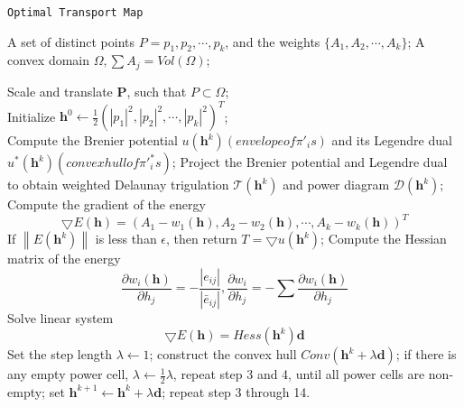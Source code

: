 \begin{algorithm}[H]
    \renewcommand{\algorithmicrequire}{\textbf{Input:}}
	\renewcommand{\algorithmicensure}{\textbf{Output:}}
    \caption{\texttt{Optimal Transport Map}}
    \label{alg:Optimal Transport Map}
    \begin{algorithmic}[1]
        \REQUIRE A set of distinct points $P={p_1, p_2, \cdots , p_k}$, and the weights $\{A_1, A_2, \cdots , A_k \}$; A convex domain $\Omega, \sum A_j = Vol(\Omega)$;

        \STATE Scale and translate $\mathbf{P}$, such that $P \subset \Omega$;\\
        \STATE Initialize $\mathbf{h}^0 \gets \frac{1}{2} \left ( \left | p_1 \right |^2, \left | p_2 \right |^2, \cdots, \left | p_k \right |^2   \right )^T  $;\\  
        \STATE Compute the Brenier potential $u(\mathbf{h}^k)(envelope of \pi'_is)$ and its Legendre dual $u^* (\mathbf{h}^k)(convex hull of \pi'^{*}_is)$;
        \STATE Project the Brenier potential and Legendre dual to obtain weighted Delaunay trigulation $\mathcal{T}(\mathbf{h}^k)$ and power diagram $\mathcal{D}(\mathbf{h}^k)$;
        \STATE Compute the gradient of the energy
            \begin{equation*}
                \bigtriangledown E(\mathbf{h} )=(A_1-w_1(\mathbf{h}), A_2-w_2(\mathbf{h}), \cdots , A_k-w_k(\mathbf{h} ) )^T
            \end{equation*}
        \STATE If $\left \| E(\mathbf{h}^k) \right \| $ is less than $\epsilon$, then return $T=\bigtriangledown u(\mathbf{h}^k)$;
        \STATE Compute the Hessian matrix of the energy
            \begin{equation*}
                \frac{\partial w_i(\mathbf{h})}{\partial h_j}=-\frac{\left | e_{ij} \right | }{\left | \bar{e}_{ij}  \right | } , \frac{\partial  w_i}{\partial  h_j} =-\sum \frac{\partial  w_i(\mathbf{h})}{\partial h_j}  
            \end{equation*}
        \STATE Solve linear system 
            \begin{equation*}
                \bigtriangledown E(\mathbf{h})=Hess(\mathbf{h}^k)\mathbf{d}
            \end{equation*}
        \STATE Set the step length $\lambda \gets 1$;
        \STATE construct the convex hull $Conv(\mathbf{h}^k + \lambda \mathbf{d})$;
        \STATE if there is any empty power cell, $\lambda \gets \frac{1}{2} \lambda $, repeat step 3 and 4, until all power cells are non-empty;
        \STATE set $\mathbf{h}^{k+1} \gets \mathbf{h}^{k} + \lambda \mathbf{d}$;
        \STATE repeat step 3 through 14.
    \end{algorithmic}
\end{algorithm}


